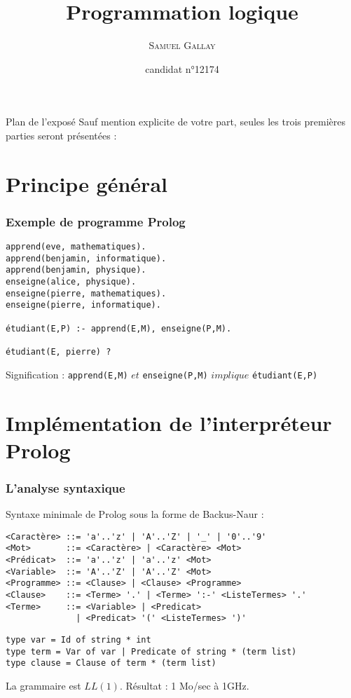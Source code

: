 \documentclass[aspectratio=43]{beamer}
\title{Programmation logique}
\author{\textsc{Samuel Gallay}}
\date{candidat n°12174}
\begin{document}
\frame{\titlepage}

\begin{frame}{Plan de l'exposé}
Sauf mention explicite de votre part, seules les trois premières parties seront présentées :
  \tableofcontents
\end{frame}

\section{Principe général}



\begin{frame}[fragile]
  \frametitle{Exemple de programme Prolog}
  \begin{verbatim}
apprend(eve, mathematiques).
apprend(benjamin, informatique).
apprend(benjamin, physique).
enseigne(alice, physique).
enseigne(pierre, mathematiques).
enseigne(pierre, informatique).

étudiant(E,P) :- apprend(E,M), enseigne(P,M).

étudiant(E, pierre) ?
  \end{verbatim}
  
  \begin{exampleblock}{Signification :}
    \texttt{apprend(E,M)} $et$ \texttt{enseigne(P,M)} $implique$ \texttt{étudiant(E,P)}
  \end{exampleblock}

\end{frame}

\section{Implémentation de l'interpréteur Prolog}

\begin{frame}[fragile]
  \frametitle{L'analyse syntaxique}
  Syntaxe minimale de Prolog sous la forme de Backus-Naur :
  \begin{verbatim}
<Caractère> ::= 'a'..'z' | 'A'..'Z' | '_' | '0'..'9'
<Mot>       ::= <Caractère> | <Caractère> <Mot>
<Prédicat>  ::= 'a'..'z' | 'a'..'z' <Mot>
<Variable>  ::= 'A'..'Z' | 'A'..'Z' <Mot>
<Programme> ::= <Clause> | <Clause> <Programme>
<Clause>    ::= <Terme> '.' | <Terme> ':-' <ListeTermes> '.'
<Terme>     ::= <Variable> | <Predicat>
              | <Predicat> '(' <ListeTermes> ')'
  \end{verbatim}
  
  \vspace{1em}

  \begin{verbatim}
type var = Id of string * int
type term = Var of var | Predicate of string * (term list)
type clause = Clause of term * (term list)
  \end{verbatim}

  \vspace{1em}
  La grammaire est $LL(1)$. Résultat : 1 Mo/sec à 1GHz.
\end{frame}
\end{document}
